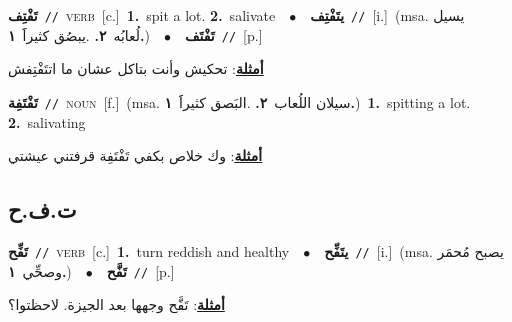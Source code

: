 \documentclass[10pt,a4paper,twoside]{article} %
\begin{document}
\begin{multicols}{2}
{{{{{{{{{{{{\setlength\topsep{0pt}\textbf{\foreignlanguage{arabic}{تَفْتِف}}\ {\color{gray}\texttt{//}\color{black}}\ \textsc{verb}\ [c.]\ \textbf{1.}~spit a lot.  \textbf{2.}~salivate\ \ $\bullet$\ \ \setlength\topsep{0pt}\textbf{\foreignlanguage{arabic}{يتَفْتِف}}\ {\color{gray}\texttt{//}\color{black}}\ [i.]\ \color{gray}(msa. \foreignlanguage{arabic}{يسيل لُعابُه}~\foreignlanguage{arabic}{\textbf{٢.}}  .\foreignlanguage{arabic}{يبصُق كثيراََ}~\foreignlanguage{arabic}{\textbf{١.}})\color{black}\ \ $\bullet$\ \ \setlength\topsep{0pt}\textbf{\foreignlanguage{arabic}{تَفْتَف}}\ {\color{gray}\texttt{//}\color{black}}\ [p.]\  \begin{flushright}\color{gray}\foreignlanguage{arabic}{\textbf{\underline{\foreignlanguage{arabic}{أمثلة}}}: تحكيش وأنت بتاكل عشان ما اتتَفْتِفش}\end{flushright}\color{black}} \vspace{2mm}

{\setlength\topsep{0pt}\textbf{\foreignlanguage{arabic}{تَفْتَفِة}}\ {\color{gray}\texttt{//}\color{black}}\ \textsc{noun}\ [f.]\ \color{gray}(msa. \foreignlanguage{arabic}{سيلان اللُعاب}~\foreignlanguage{arabic}{\textbf{٢.}}  .\foreignlanguage{arabic}{البَصق كثيراََ}~\foreignlanguage{arabic}{\textbf{١.}})\color{black}\ \textbf{1.}~spitting a lot.  \textbf{2.}~salivating\  \begin{flushright}\color{gray}\foreignlanguage{arabic}{\textbf{\underline{\foreignlanguage{arabic}{أمثلة}}}: وك خلاص بكفي تَفْتَفِة قرفتني عيشتي}\end{flushright}\color{black}} \vspace{2mm}

\vspace{-3mm}
\subsection*{\color{blue}\foreignlanguage{arabic}{ت.ف.ح}\color{blue}{}} 

{\setlength\topsep{0pt}\textbf{\foreignlanguage{arabic}{تَفِّح}}\ {\color{gray}\texttt{//}\color{black}}\ \textsc{verb}\ [c.]\ \textbf{1.}~turn reddish and healthy\ \ $\bullet$\ \ \setlength\topsep{0pt}\textbf{\foreignlanguage{arabic}{يتَفِّح}}\ {\color{gray}\texttt{//}\color{black}}\ [i.]\ \color{gray}(msa. \foreignlanguage{arabic}{يصبح مُحمَر وصحِّي}~\foreignlanguage{arabic}{\textbf{١.}})\color{black}\ \ $\bullet$\ \ \setlength\topsep{0pt}\textbf{\foreignlanguage{arabic}{تَفَّح}}\ {\color{gray}\texttt{//}\color{black}}\ [p.]\  \begin{flushright}\color{gray}\foreignlanguage{arabic}{\textbf{\underline{\foreignlanguage{arabic}{أمثلة}}}: تَفَّح وجهها بعد الجيزة. لاحظتوا؟}\end{flushright}\color{black}} \vspace{2mm}

}}}}}}}}}}}
\end{multicols}
\end{document}
